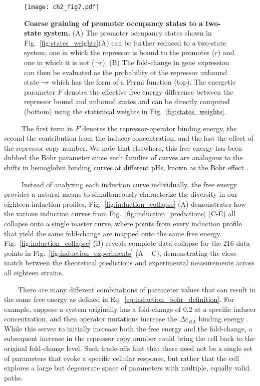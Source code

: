 \documentclass[12pt]{caltech_thesis}
\begin{document}
\hypertarget{fig:collapse_coarse_graining}{%
\begin{figure}
\centering
\texttt{[image: ch2\_fig7.pdf]}
\caption[{Coarse graining of promoter occupancy states to a two-state
system.}]{\textbf{Coarse graining of promoter occupancy states to a
two-state system.} (A) The promoter occupancy states shown in
Fig.~\ref{fig:states_weights}(A) can be further reduced to a two-state
system; one in which the repressor is bound to the promoter (\(r\)) and
one in which it is not (\(\neg r\)). (B) The fold-change in gene
expression can then be evaluated as the probability of the repressor
unbound state \(\neg r\) which has the form of a Fermi function (top).
The energetic parameter \(F\) denotes the effective free energy
difference between the repressor bound and unbound states and can be
directly computed (bottom) using the statistical weights in
Fig.~\ref{fig:states_weights}.}
\label{fig:collapse_coarse_graining}
\end{figure}
}

~~~~~The first term in \(F\) denotes the repressor-operator binding
energy, the second the contribution from the inducer concentration, and
the last the effect of the repressor copy number. We note that
elsewhere, this free energy has been dubbed the Bohr parameter since
such families of curves are analogous to the shifts in hemoglobin
binding curves at different pHs, known as the Bohr effect
\autocite{mirny2010,phillips2015,einav2016}.

~~~~~Instead of analyzing each induction curve individually, the free
energy provides a natural means to simultaneously characterize the
diversity in our eighteen induction profiles.
Fig.~\ref{fig:induction_collapse} (A) demonstrates how the various
induction curves from Fig.~\ref{fig:induction_predictions} (C-E) all
collapse onto a single master curve, where points from every induction
profile that yield the same fold-change are mapped onto the same free
energy. Fig.~\ref{fig:induction_collapse} (B) reveals complete data
collapse for the 216 data points in Fig.~\ref{fig:induction_experiments}
(A -- C), demonstrating the close match between the theoretical
predictions and experimental measurements across all eighteen strains.

~~~~There are many different combinations of parameter values that can
result in the same free energy as defined in
Eq.~\ref{eq:induction_bohr_definition}. For example, suppose a system
originally has a fold-change of 0.2 at a specific inducer concentration,
and then operator mutations increase the \(\Delta\varepsilon_{RA}\)
binding energy \autocite{garcia2011}. While this serves to initially
increase both the free energy and the fold-change, a subsequent increase
in the repressor copy number could bring the cell back to the original
fold-change level. Such trade-offs hint that there need not be a single
set of parameters that evoke a specific cellular response, but rather
that the cell explores a large but degenerate space of parameters with
multiple, equally valid paths.
\end{document}
